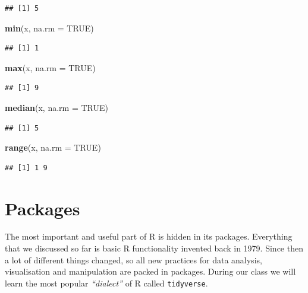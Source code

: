 \documentclass[
]{book}
\newenvironment{Shaded}{\begin{snugshade}}{\end{snugshade}}
\newcommand{\DataTypeTok}[1]{\textcolor[rgb]{0.13,0.29,0.53}{#1}}
\newcommand{\KeywordTok}[1]{\textcolor[rgb]{0.13,0.29,0.53}{\textbf{#1}}}
\newcommand{\NormalTok}[1]{#1}
\newcommand{\OtherTok}[1]{\textcolor[rgb]{0.56,0.35,0.01}{#1}}
\begin{document}
\begin{verbatim}
## [1] 5
\end{verbatim}

\begin{Shaded}
\begin{Highlighting}[]
\KeywordTok{min}\NormalTok{(x, }\DataTypeTok{na.rm =} \OtherTok{TRUE}\NormalTok{)}
\end{Highlighting}
\end{Shaded}

\begin{verbatim}
## [1] 1
\end{verbatim}

\begin{Shaded}
\begin{Highlighting}[]
\KeywordTok{max}\NormalTok{(x, }\DataTypeTok{na.rm =} \OtherTok{TRUE}\NormalTok{)}
\end{Highlighting}
\end{Shaded}

\begin{verbatim}
## [1] 9
\end{verbatim}

\begin{Shaded}
\begin{Highlighting}[]
\KeywordTok{median}\NormalTok{(x, }\DataTypeTok{na.rm =} \OtherTok{TRUE}\NormalTok{)}
\end{Highlighting}
\end{Shaded}

\begin{verbatim}
## [1] 5
\end{verbatim}

\begin{Shaded}
\begin{Highlighting}[]
\KeywordTok{range}\NormalTok{(x, }\DataTypeTok{na.rm =} \OtherTok{TRUE}\NormalTok{)}
\end{Highlighting}
\end{Shaded}

\begin{verbatim}
## [1] 1 9
\end{verbatim}

\hypertarget{packages}{%
\section{Packages}\label{packages}}

The most important and useful part of R is hidden in its packages. Everything that we discussed so far is basic R functionality invented back in 1979. Since then a lot of different things changed, so all new practices for data analysis, visualisation and manipulation are packed in packages. During our class we will learn the most popular \emph{``dialect''} of R called \texttt{tidyverse}.
\end{document}
